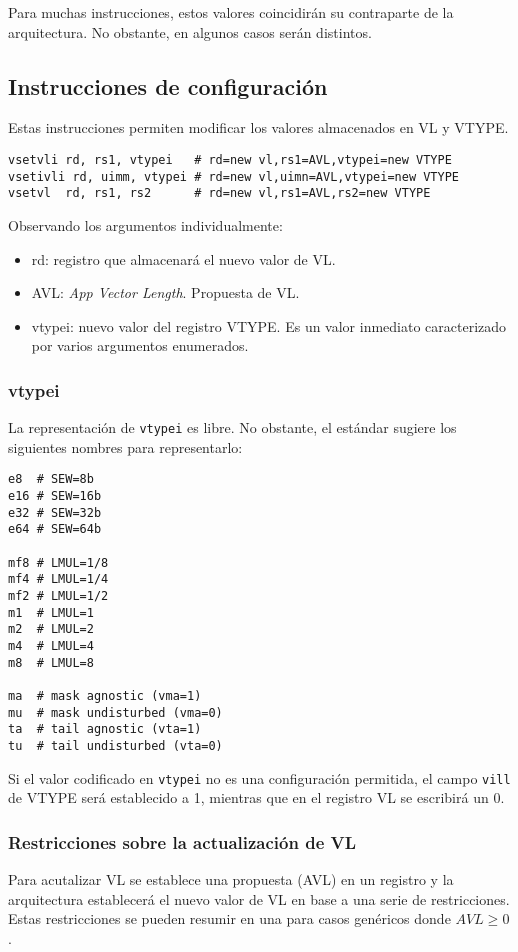 Para muchas instrucciones, estos valores coincidirán su contraparte de la arquitectura. No obstante, en algunos casos serán distintos.

\subsection{Instrucciones de configuración}\label{conf-instructions}
Estas instrucciones permiten modificar los valores almacenados en VL y VTYPE.

\begin{lstlisting}
vsetvli rd, rs1, vtypei   # rd=new vl,rs1=AVL,vtypei=new VTYPE
vsetivli rd, uimm, vtypei # rd=new vl,uimn=AVL,vtypei=new VTYPE
vsetvl  rd, rs1, rs2      # rd=new vl,rs1=AVL,rs2=new VTYPE
\end{lstlisting}

Observando los argumentos individualmente:
\begin{itemize}
    \item rd: registro que almacenará el nuevo valor de VL.
    \item AVL: \textit{App Vector Length}. Propuesta de VL.
    \item vtypei: nuevo valor del registro VTYPE. Es un valor inmediato caracterizado por varios argumentos enumerados.
\end{itemize}

\subsubsection{vtypei}
La representación de \texttt{vtypei} es libre. No obstante, el estándar sugiere
los siguientes nombres para representarlo:

\begin{lstlisting}
e8  # SEW=8b   
e16 # SEW=16b
e32 # SEW=32b
e64 # SEW=64b

mf8 # LMUL=1/8
mf4 # LMUL=1/4
mf2 # LMUL=1/2
m1  # LMUL=1
m2  # LMUL=2
m4  # LMUL=4
m8  # LMUL=8

ma  # mask agnostic (vma=1)
mu  # mask undisturbed (vma=0)
ta  # tail agnostic (vta=1)
tu  # tail undisturbed (vta=0)
\end{lstlisting}

Si el valor codificado en \texttt{vtypei} no es una configuración permitida, el
campo \texttt{vill} de VTYPE será establecido a 1, mientras que en el registro
VL se escribirá un 0.

\subsubsection{Restricciones sobre la actualización de VL}
Para acutalizar VL se establece una propuesta (AVL) en un registro y la
arquitectura establecerá el nuevo valor de VL en base a una serie de
restricciones. Estas restricciones se pueden resumir en una para casos
genéricos donde $AVL \ge 0$.

